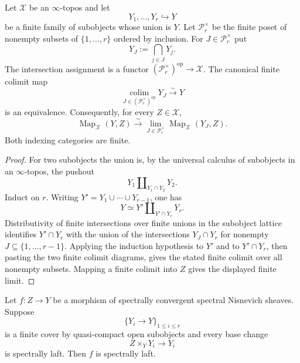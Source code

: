 \begin{lemma}
\label{lem:bnli-finite-subobject-descent}
Let $\mathcal X$ be an $\infty$-topos and let
\[
    Y_1,\ldots,Y_r\hookrightarrow Y
\]
be a finite family of subobjects whose union is $Y$.  Let $\mathcal P_r^\times$ be the finite poset of nonempty subsets of
$\{1,\ldots,r\}$ ordered by inclusion.  For $J\in\mathcal P_r^\times$ put
\[
    Y_J:=\bigcap_{j\in J}Y_j.
\]
The intersection assignment is a functor
$(\mathcal P_r^\times)^{\mathrm{op}}\to\mathcal X$.  The canonical finite
colimit map
\[
\boxed{
    \operatorname*{colim}_{J\in(\mathcal P_r^\times)^{\mathrm{op}}}
    Y_J
    \xrightarrow{\sim}Y}
\]
is an equivalence.  Consequently, for every $Z\in\mathcal X$,
\[
\boxed{
    \operatorname{Map}_{\mathcal X}(Y,Z)
    \xrightarrow{\sim}
    \operatorname*{lim}_{J\in\mathcal P_r^\times}
    \operatorname{Map}_{\mathcal X}(Y_J,Z).}
\]
Both indexing categories are finite.
\end{lemma}

\begin{proof}
For two subobjects the union is, by the universal calculus of subobjects in an
$\infty$-topos, the pushout
\[
    Y_1\amalg_{Y_1\cap Y_2}Y_2.
\]
Induct on $r$.  Writing $Y'=Y_1\cup\cdots\cup Y_{r-1}$, one has
\[
    Y\simeq Y'\amalg_{Y'\cap Y_r}Y_r.
\]
Distributivity of finite intersections over finite unions in the subobject
lattice identifies $Y'\cap Y_r$ with the union of the intersections
$Y_J\cap Y_r$ for nonempty $J\subseteq\{1,\ldots,r-1\}$.  Applying the
induction hypothesis to $Y'$ and to $Y'\cap Y_r$, then pasting the two finite
colimit diagrams, gives the stated finite colimit over all nonempty subsets.
Mapping a finite colimit into $Z$ gives the displayed finite limit.
\end{proof}

\begin{lemma}
\label{lem:bnli-finite-open-laft}
Let $f:Z\to Y$ be a morphism of spectrally convergent spectral Nisnevich
sheaves.  Suppose
\[
    \{Y_i\longrightarrow Y\}_{1\le i\le r}
\]
is a finite cover by quasi-compact open subobjects and every base change
\[
    Z\times_YY_i\longrightarrow Y_i
\]
is spectrally laft.  Then $f$ is spectrally laft.
\end{lemma}

